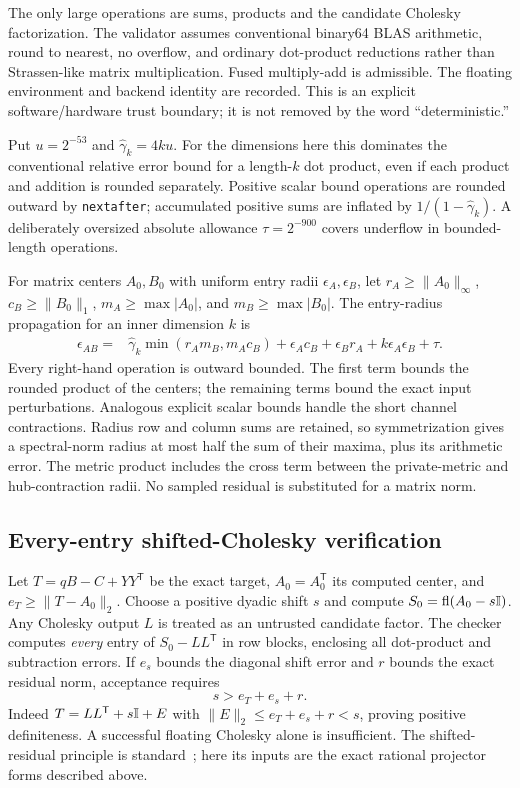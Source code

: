 \documentclass[11pt,a4paper]{article}
\theoremstyle{remark}\newtheorem{remark}[theorem]{Remark}
\begin{document}
The only large operations are sums, products and the candidate Cholesky factorization. The validator assumes conventional binary64 BLAS arithmetic, round to nearest, no overflow, and ordinary dot-product reductions rather than Strassen-like matrix multiplication. Fused multiply-add is admissible. The floating environment and backend identity are recorded. This is an explicit software/hardware trust boundary; it is not removed by the word ``deterministic.''

Put $u=2^{-53}$ and $\widehat\gamma_k=4ku$. For the dimensions here this dominates the conventional relative error bound for a length-$k$ dot product, even if each product and addition is rounded separately. Positive scalar bound operations are rounded outward by \texttt{nextafter}; accumulated positive sums are inflated by $1/(1-\widehat\gamma_k)$. A deliberately oversized absolute allowance $\tau=2^{-900}$ covers underflow in bounded-length operations.

For matrix centers $A_0,B_0$ with uniform entry radii $\epsilon_A,\epsilon_B$, let $r_A\ge\|A_0\|_\infty$, $c_B\ge\|B_0\|_1$, $m_A\ge\max|A_0|$, and $m_B\ge\max|B_0|$. The entry-radius propagation for an inner dimension $k$ is
\begin{align}\label{eq:ballproduct}
 \epsilon_{AB}={}&\widehat\gamma_k\min(r_A m_B,m_A c_B)
 +\epsilon_Ac_B+\epsilon_Br_A+k\epsilon_A\epsilon_B+\tau.
\end{align}
Every right-hand operation is outward bounded. The first term bounds the rounded product of the centers; the remaining terms bound the exact input perturbations. Analogous explicit scalar bounds handle the short channel contractions. Radius row and column sums are retained, so symmetrization gives a spectral-norm radius at most half the sum of their maxima, plus its arithmetic error. The metric product includes the cross term between the private-metric and hub-contraction radii. No sampled residual is substituted for a matrix norm.

\subsection{Every-entry shifted-Cholesky verification}
Let $T=qB-C+YY^{\mathsf T}$ be the exact target, $A_0=A_0^{\mathsf T}$ its computed center, and $e_T\ge\|T-A_0\|_2$. Choose a positive dyadic shift $s$ and compute $S_0=\mathrm{fl}(A_0-s\mathbb I)$. Any Cholesky output $L$ is treated as an untrusted candidate factor. The checker computes \emph{every} entry of $S_0-LL^{\mathsf T}$ in row blocks, enclosing all dot-product and subtraction errors. If $e_s$ bounds the diagonal shift error and $r$ bounds the exact residual norm, acceptance requires
\begin{equation}\label{eq:accept}
 s>e_T+e_s+r.
\end{equation}
Indeed $T=LL^{\mathsf T}+s\mathbb I+E$ with $\|E\|_2\le e_T+e_s+r<s$, proving positive definiteness. A successful floating Cholesky alone is insufficient. The shifted-residual principle is standard~\cite{Rump}; here its inputs are the exact rational projector forms described above.
\end{document}
